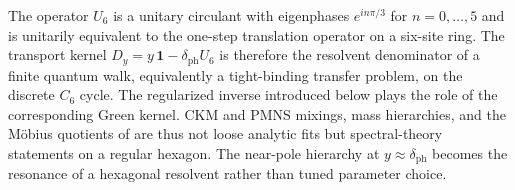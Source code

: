 \begin{remark}
The operator $U_6$ is a unitary circulant with eigenphases $e^{in\pi/3}$ for $n=0,\dots,5$ and is unitarily equivalent to the one-step translation operator on a six-site ring. The transport kernel $D_y=y\,\mathbf 1-\delta_{\mathrm{ph}}U_6$ is therefore the resolvent denominator of a finite quantum walk, equivalently a tight-binding transfer problem, on the discrete $C_6$ cycle. The regularized inverse introduced below plays the role of the corresponding Green kernel. CKM and PMNS mixings, mass hierarchies, and the Möbius quotients of  are thus not loose analytic fits but spectral-theory statements on a regular hexagon. The near-pole hierarchy at $y\approx\delta_{\mathrm{ph}}$ becomes the resonance of a hexagonal resolvent rather than tuned parameter choice.
\end{remark}

